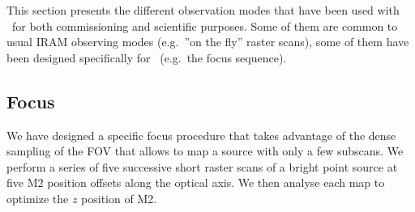 

This section presents the different observation modes that have been used with
\nika\ for both commissioning and scientific purposes. Some of them are common
to usual IRAM observing modes (e.g.~''on the fly'' raster scans), some of them
have been designed specifically for \nika\ (e.g.~the focus sequence). 



\subsection{Focus}
\label{se:axial_focus}

We have designed a specific focus procedure that takes
advantage of the dense sampling of the FOV that allows to map a source with only
a few subscans. We perform a series of five successive short raster scans of a
bright point source at five M2 position offsets along the optical axis.%
We then analyse each map to optimize the $z$ position of M2.

